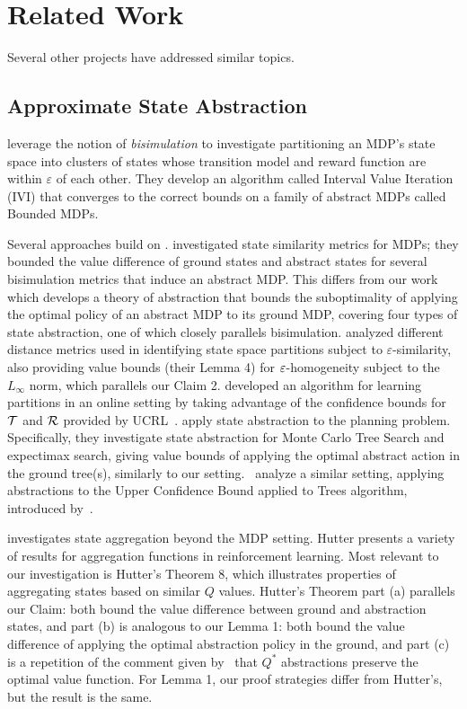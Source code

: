 \section{Related Work}

Several other projects have addressed similar topics.

\subsection{Approximate State Abstraction}
\citet{dean1997model} leverage the notion of {\it bisimulation} to investigate partitioning an \ac{MDP}'s state space into clusters of states whose transition model and reward function are within $\varepsilon$ of each other. They develop an algorithm called Interval Value Iteration (IVI) that converges to the correct bounds on a family of abstract MDPs called Bounded \acp{MDP}.

Several approaches build on \citet{dean1997model}. \citet{ferns2004metrics,ferns2006methods} investigated state similarity metrics for \acp{MDP}; they bounded the value difference of ground states and abstract states for several bisimulation metrics that induce an abstract MDP. This differs from our work which develops a theory of abstraction that bounds the suboptimality of applying the optimal policy of an abstract MDP to its ground MDP, covering four types of state abstraction, one of which closely parallels bisimulation. \citet{even2003approximate} analyzed different distance metrics used in identifying state space partitions subject to $\varepsilon$-similarity, also providing value bounds (their Lemma 4) for $\varepsilon$-homogeneity subject to the $L_\infty$ norm, which parallels our Claim 2. \citet{ortner2013adaptive} developed an algorithm for learning partitions in an online setting by taking advantage of the confidence bounds for $\mathcal{T}$ and $\mathcal{R}$ provided by UCRL~\cite{auer2009near}. \citet{Hostetler2014} apply state abstraction to the planning problem. Specifically, they investigate state abstraction for Monte Carlo Tree Search and expectimax search, giving value bounds of applying the optimal abstract action in the ground tree(s), similarly to our setting.~\citet{jiang2014improving} analyze a similar setting, applying abstractions to the Upper Confidence Bound applied to Trees algorithm, introduced by~\citet{kocsis2006bandit}.

\citet{hutter2016extreme,hutter2014extreme} investigates state aggregation beyond the MDP setting. Hutter presents a variety of results for aggregation functions in reinforcement learning. Most relevant to our investigation is Hutter's Theorem 8, which illustrates properties of aggregating states based on similar $Q$ values. Hutter's Theorem part (a) parallels our Claim: both bound the value difference between ground and abstraction states, and part (b) is analogous to our Lemma 1: both bound the value difference of applying the optimal abstraction policy in the ground, and part (c) is a repetition of the comment given by~\citet{li2006towards} that $Q^*$ abstractions preserve the optimal value function. For Lemma 1, our proof strategies differ from Hutter's, but the result is the same.

